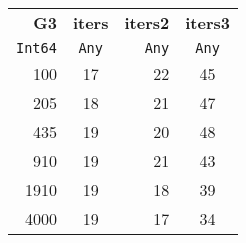 \begin{tabular}{rcrc}
  \hline\hline
  \textbf{G3} & \textbf{iters} & \textbf{iters2} & \textbf{iters3} \\
  \texttt{Int64} & \texttt{Any} & \texttt{Any} & \texttt{Any} \\\hline
  100 & 17 & 22 & 45 \\
  205 & 18 & 21 & 47 \\
  435 & 19 & 20 & 48 \\
  910 & 19 & 21 & 43 \\
  1910 & 19 & 18 & 39 \\
  4000 & 19 & 17 & 34 \\\hline\hline
\end{tabular}
